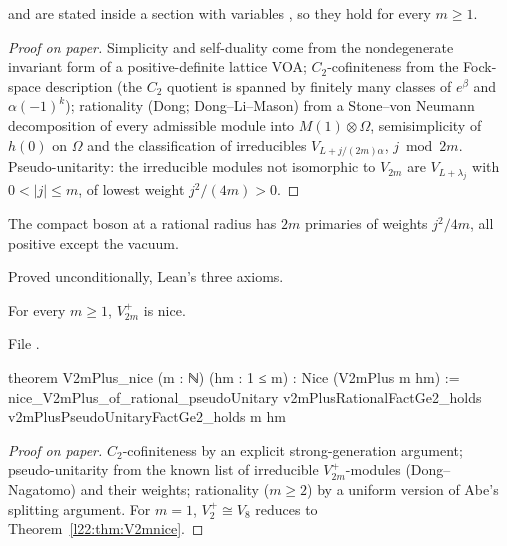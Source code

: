 \begin{dictionary}
 and  are stated inside a section with variables ,
so they hold for every $m\ge1$.
\end{dictionary}

\begin{proof}[Proof on paper]
Simplicity and self-duality come from the nondegenerate invariant form of a positive-definite lattice VOA;
$C_2$-cofiniteness from the Fock-space description (the $C_2$ quotient is spanned by finitely many classes of
$e^{\beta}$ and $\alpha(-1)^k$); rationality (Dong; Dong--Li--Mason) from a Stone--von Neumann decomposition of every
admissible module into $M(1)\otimes\Omega$, semisimplicity of $h(0)$ on $\Omega$ and the classification of irreducibles
$V_{L+j/(2m)\alpha}$, $j\bmod 2m$. Pseudo-unitarity: the irreducible modules not isomorphic to $V_{2m}$ are
$V_{L+\lambda_j}$ with $0<|j|\le m$, of lowest weight $j^2/(4m)>0$.
\end{proof}

\begin{physics}
The compact boson at a rational radius has $2m$ primaries of weights $j^2/4m$, all positive except the vacuum.
\end{physics}

\begin{status}
Proved unconditionally, Lean's three axioms.
\end{status}

\begin{theorem}[$V_{2m}^+$ is nice]\label{l22:thm:plusnice}
For every $m\ge1$, $V_{2m}^+$ is nice.
\end{theorem}
\noindent File .
\begin{leancode}
theorem V2mPlus_nice (m : ℕ) (hm : 1 ≤ m) : Nice (V2mPlus m hm) :=
  nice_V2mPlus_of_rational_pseudoUnitary v2mPlusRationalFactGe2_holds
    v2mPlusPseudoUnitaryFactGe2_holds m hm
\end{leancode}

\begin{proof}[Proof on paper]
$C_2$-cofiniteness by an explicit strong-generation argument; pseudo-unitarity from the known list of irreducible
$V_{2m}^+$-modules (Dong--Nagatomo) and their weights; rationality ($m\ge2$) by a uniform version of Abe's
splitting argument. For $m=1$, $V_2^+\cong V_8$ reduces to Theorem~\ref{l22:thm:V2mnice}.
\end{proof}


